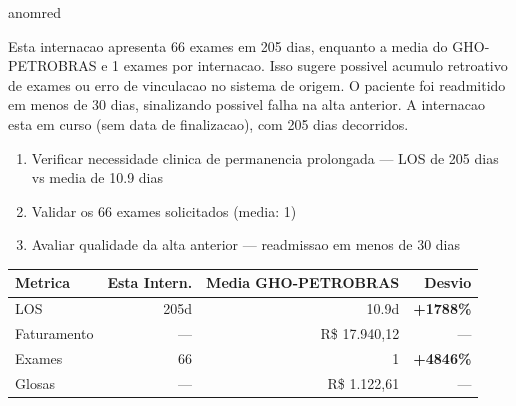 \documentclass[a4paper,10pt]{article}
\begin{document}
\begin{anomalycard}[Internacao 145780 | GHO-PETROBRAS | CRITICO (z=6.04)]{anomred}
\vspace{2pt}\begin{tcolorbox}[colback=severityred!20,colframe=anomred,title={\textbf{Interpretacao de Negocio}},fonttitle=\bfseries\small,left=4pt,right=4pt,top=3pt,bottom=3pt]
{\small Esta internacao apresenta 66 exames em 205 dias, enquanto a media do GHO-PETROBRAS e 1 exames por internacao. Isso sugere possivel acumulo retroativo de exames ou erro de vinculacao no sistema de origem. O paciente foi readmitido em menos de 30 dias, sinalizando possivel falha na alta anterior. A internacao esta em curso (sem data de finalizacao), com 205 dias decorridos.}
\end{tcolorbox}
\begin{tcolorbox}[colback=severityyellow!30,colframe=anomorange,title={\textbf{Recomendacoes Especificas}},fonttitle=\bfseries\small,left=4pt,right=4pt,top=3pt,bottom=3pt]
\begin{enumerate}[nosep,leftmargin=16pt]
\item {\small Verificar necessidade clinica de permanencia prolongada --- LOS de 205 dias vs media de 10.9 dias}
\item {\small Validar os 66 exames solicitados (media: 1)}
\item {\small Avaliar qualidade da alta anterior --- readmissao em menos de 30 dias}
\end{enumerate}
\end{tcolorbox}
\begin{center}\begin{tabular}{l r r r}\toprule\textbf{Metrica} & \textbf{Esta Intern.} & \textbf{Media GHO-PETROBRAS} & \textbf{Desvio} \\\midrule
LOS & 205d & 10.9d & \textcolor{anomred}{\textbf{+1788\%}} \\
Faturamento & --- & R\$ 17.940,12 & --- \\
Exames & 66 & 1 & \textcolor{anomred}{\textbf{+4846\%}} \\
Glosas & --- & R\$ 1.122,61 & --- \\
\bottomrule\end{tabular}\end{center}


\end{anomalycard}
\end{document}
